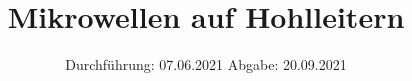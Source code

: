 

\usepackage{nicefrac}

\subject{V 53}
\title{Mikrowellen auf Hohlleitern}
\date{%
  Durchführung: 07.06.2021
  \hspace{3em}
  Abgabe: 20.09.2021
}



\maketitle
\thispagestyle{empty}
\tableofcontents
\newpage







\printbibliography{}


